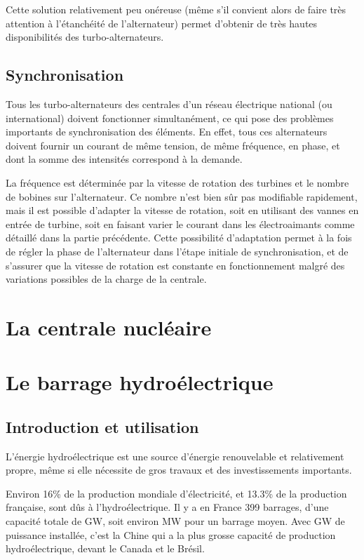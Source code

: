 \documentclass[12pt,a4paper,oneside,openany]{memoir}
\begin{document}
Cette solution relativement peu onéreuse (même s'il convient alors de faire très attention à l'étanchéité de l'alternateur) permet d'obtenir de très hautes disponibilités des turbo-alternateurs.


\section{Synchronisation}
Tous les turbo-alternateurs des centrales d'un réseau électrique national (ou international) doivent fonctionner simultanément, ce qui pose des problèmes importants de synchronisation des éléments. En effet, tous ces alternateurs doivent fournir un courant de même tension, de même fréquence, en phase, et dont la somme des intensités correspond à la demande.

La fréquence est déterminée par la vitesse de rotation des turbines et le nombre de bobines sur l'alternateur. Ce nombre n'est bien sûr pas modifiable rapidement, mais il est possible d'adapter la vitesse de rotation, soit en utilisant des vannes en entrée de turbine, soit en faisant varier le courant dans les électroaimants comme détaillé dans la partie précédente. Cette possibilité d'adaptation permet à la fois de régler la phase de l'alternateur dans l'étape initiale de synchronisation, et de s'assurer que la vitesse de rotation est constante en fonctionnement malgré des variations possibles de la charge de la centrale.


\chapter{La centrale nucléaire}


\chapter{Le barrage hydroélectrique}

\section{Introduction et utilisation}
L'énergie hydroélectrique est une source d'énergie renouvelable et relativement propre, même si elle nécessite de gros travaux et des investissements importants.

Environ 16\% de la production mondiale d'électricité, et 13.3\% de la production française, sont dûs à l'hydroélectrique. Il y a en France 399 barrages, d'une capacité totale de \unit[25]{GW}, soit environ \unit[62]{MW} pour un barrage moyen. Avec \unit[196]{GW} de puissance installée, c'est la Chine qui a la plus grosse capacité de production hydroélectrique, devant le Canada et le Brésil. 
\end{document}
